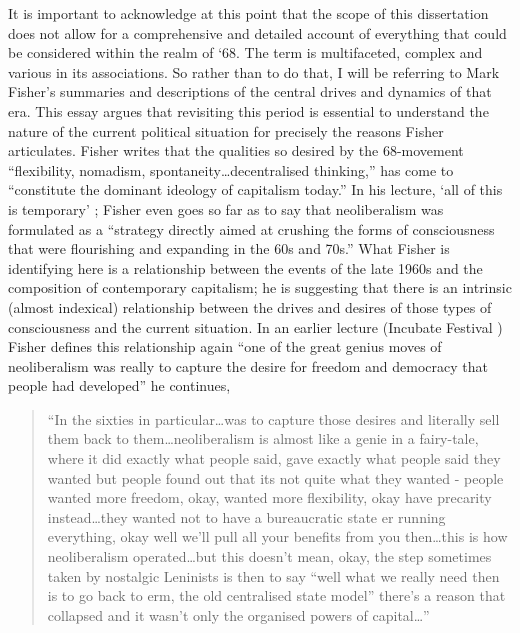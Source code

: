 \documentclass[12pt]{article}
\begin{document}
It is important to acknowledge at this point that the scope of this dissertation does not allow for a comprehensive and detailed account of everything that could be considered within the realm of `68. The term is multifaceted, complex and various in its associations. So rather than to do that, I will be referring to Mark Fisher's \citeyear{Fisher:2009aa} summaries and descriptions of the central drives and dynamics of that era. This essay argues that revisiting this period is essential to understand the nature of the current political situation for precisely the reasons Fisher articulates. Fisher writes that the qualities so desired by the 68-movement ``flexibility, nomadism, spontaneity\dots  decentralised thinking,'' has come to ``constitute the dominant ideology of capitalism today.'' In his lecture, `all of this is temporary' \citeyear{Fischer:2016aa}; Fisher even goes so far as to say that neoliberalism was formulated as a ``strategy directly aimed at crushing the forms of consciousness that were flourishing and expanding in the 60s and 70s.'' What Fisher is identifying here is a relationship between the events of the late 1960s and the composition of contemporary capitalism; he is suggesting that there is an intrinsic (almost indexical) relationship between the drives and desires of those types of consciousness and the current situation. In an earlier lecture (Incubate Festival \citeyear{Fisher:2012aa}) Fisher defines this relationship again  ``one of the great genius moves of neoliberalism was really to capture the desire for freedom and democracy that people had developed'' he continues, 
\begin{quote}
``In the sixties in particular\dots  was to capture those desires and literally sell them back to them\dots  neoliberalism is almost like a genie in a fairy-tale, where it did exactly what people said, gave exactly what people said they wanted but people found out that its not quite what they wanted - people wanted more freedom, okay, wanted more flexibility, okay have precarity instead\dots  they wanted not to have a bureaucratic state er running everything, okay well we'll pull all your benefits from you then\dots  this is how neoliberalism operated\dots  but this doesn't mean, okay, the step sometimes taken by nostalgic Leninists is then to say ``well what we really need then is to go back to erm, the old centralised state model'' there's a reason that collapsed and it wasn't only the organised powers of capital\dots'' 
\end{quote}
\end{document}
